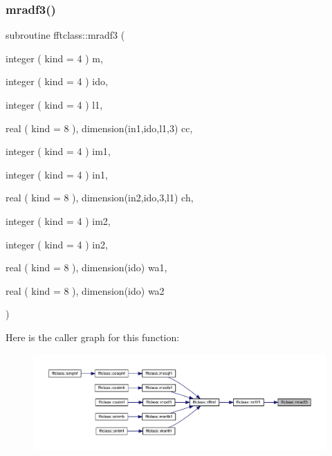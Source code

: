 \subsubsection{\texorpdfstring{mradf3()}{mradf3()}}
{\footnotesize\ttfamily subroutine fftclass\+::mradf3 (\begin{DoxyParamCaption}\item[{integer ( kind = 4 )}]{m,  }\item[{integer ( kind = 4 )}]{ido,  }\item[{integer ( kind = 4 )}]{l1,  }\item[{real ( kind = 8 ), dimension(in1,ido,l1,3)}]{cc,  }\item[{integer ( kind = 4 )}]{im1,  }\item[{integer ( kind = 4 )}]{in1,  }\item[{real ( kind = 8 ), dimension(in2,ido,3,l1)}]{ch,  }\item[{integer ( kind = 4 )}]{im2,  }\item[{integer ( kind = 4 )}]{in2,  }\item[{real ( kind = 8 ), dimension(ido)}]{wa1,  }\item[{real ( kind = 8 ), dimension(ido)}]{wa2 }\end{DoxyParamCaption})}

Here is the caller graph for this function\+:\nopagebreak
\begin{figure}[H]
\begin{center}
\leavevmode
\includegraphics[width=350pt]{namespacefftclass_a4e99b7194e96b9a086f743a98205cc5a_icgraph}
\end{center}
\end{figure}
\mbox{\label{namespacefftclass_aec86b95620b11b4db180468a4f771842}} 
